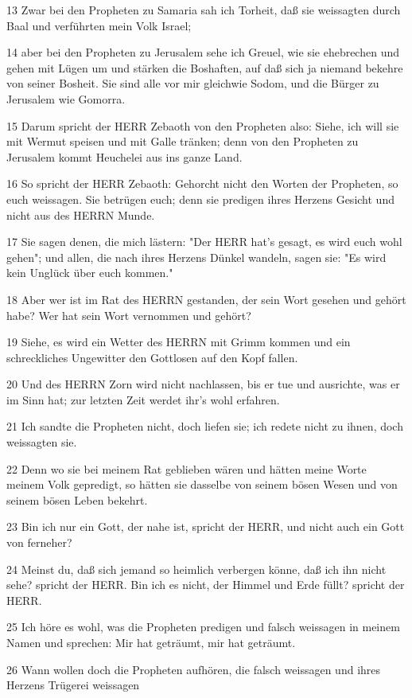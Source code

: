 \par 13 Zwar bei den Propheten zu Samaria sah ich Torheit, daß sie weissagten durch Baal und verführten mein Volk Israel;
\par 14 aber bei den Propheten zu Jerusalem sehe ich Greuel, wie sie ehebrechen und gehen mit Lügen um und stärken die Boshaften, auf daß sich ja niemand bekehre von seiner Bosheit. Sie sind alle vor mir gleichwie Sodom, und die Bürger zu Jerusalem wie Gomorra.
\par 15 Darum spricht der HERR Zebaoth von den Propheten also: Siehe, ich will sie mit Wermut speisen und mit Galle tränken; denn von den Propheten zu Jerusalem kommt Heuchelei aus ins ganze Land.
\par 16 So spricht der HERR Zebaoth: Gehorcht nicht den Worten der Propheten, so euch weissagen. Sie betrügen euch; denn sie predigen ihres Herzens Gesicht und nicht aus des HERRN Munde.
\par 17 Sie sagen denen, die mich lästern: "Der HERR hat's gesagt, es wird euch wohl gehen"; und allen, die nach ihres Herzens Dünkel wandeln, sagen sie: "Es wird kein Unglück über euch kommen."
\par 18 Aber wer ist im Rat des HERRN gestanden, der sein Wort gesehen und gehört habe? Wer hat sein Wort vernommen und gehört?
\par 19 Siehe, es wird ein Wetter des HERRN mit Grimm kommen und ein schreckliches Ungewitter den Gottlosen auf den Kopf fallen.
\par 20 Und des HERRN Zorn wird nicht nachlassen, bis er tue und ausrichte, was er im Sinn hat; zur letzten Zeit werdet ihr's wohl erfahren.
\par 21 Ich sandte die Propheten nicht, doch liefen sie; ich redete nicht zu ihnen, doch weissagten sie.
\par 22 Denn wo sie bei meinem Rat geblieben wären und hätten meine Worte meinem Volk gepredigt, so hätten sie dasselbe von seinem bösen Wesen und von seinem bösen Leben bekehrt.
\par 23 Bin ich nur ein Gott, der nahe ist, spricht der HERR, und nicht auch ein Gott von ferneher?
\par 24 Meinst du, daß sich jemand so heimlich verbergen könne, daß ich ihn nicht sehe? spricht der HERR. Bin ich es nicht, der Himmel und Erde füllt? spricht der HERR.
\par 25 Ich höre es wohl, was die Propheten predigen und falsch weissagen in meinem Namen und sprechen: Mir hat geträumt, mir hat geträumt.
\par 26 Wann wollen doch die Propheten aufhören, die falsch weissagen und ihres Herzens Trügerei weissagen
